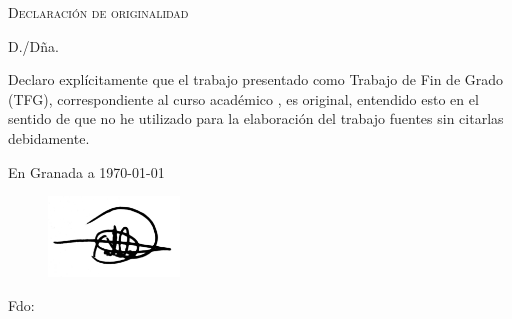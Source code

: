 %

\thispagestyle{empty}

\hfill\vfill

\textsc{Declaración de originalidad}\\\bigskip

D./Dña. \miNombre \\\medskip

Declaro explícitamente que el trabajo presentado como Trabajo de Fin de Grado (TFG), correspondiente al curso académico \miCurso, es original, entendido esto en el sentido de que no he utilizado para la elaboración del trabajo fuentes sin citarlas debidamente.
\medskip

En Granada a \today 
\vspace{3cm}
\begin{center} 
	\begin{figure}[H]
		\center
		\includegraphics[width=35mm]{img/firma.jpeg}
	\end{figure}
	
Fdo: \miNombre 

\end{center}

\vfill

\cleardoublepage
\endinput
